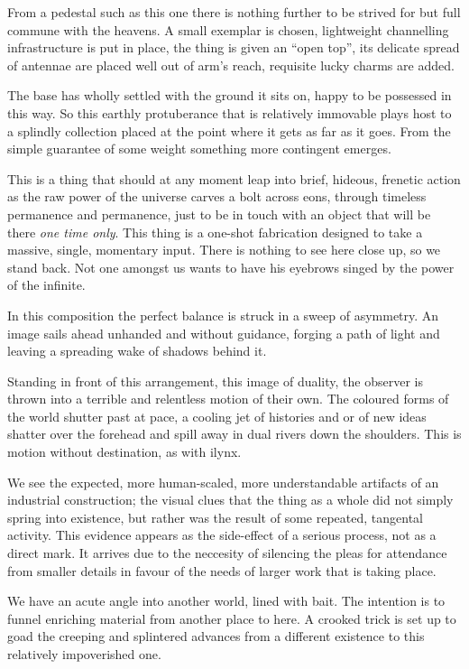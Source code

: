 \documentclass{book}
\begin{document}
From a pedestal such as this one there is nothing further to be strived for but
full commune with the heavens. A small exemplar is chosen, lightweight
channelling infrastructure is put in place, the thing is given an ``open top'',
its delicate spread of antennae are placed well out of arm's reach, requisite
lucky charms are added.

The base has wholly settled with the ground it sits on, happy to be possessed
in this way. So this earthly protuberance that is relatively immovable plays
host to a splindly collection placed at the point where it gets as far as it
goes. From the simple guarantee of some weight something more contingent
emerges.

This is a thing that should at any moment leap into brief, hideous, frenetic
action as the raw power of the universe carves a bolt across eons, through
timeless permanence and permanence, just to be in touch with an object that
will be there \emph{one time only}.  This thing is a one-shot fabrication
designed to take a massive, single, momentary input. There is nothing to see
here close up, so we stand back. Not one amongst us wants to have his eyebrows
singed by the power of the infinite.

In this composition the perfect balance is struck in a sweep of asymmetry. An
image sails ahead unhanded and without guidance, forging a path of light and
leaving a spreading wake of shadows behind it.

Standing in front of this arrangement, this image of duality, the observer is
thrown into a terrible and relentless motion of their own. The coloured forms
of the world shutter past at pace, a cooling jet of histories and or of new
ideas shatter over the forehead and spill away in dual rivers down the
shoulders. This is motion without destination, as with ilynx.

We see the expected, more human-scaled, more understandable artifacts of an
industrial construction; the visual clues that the thing as a whole did not
simply spring into existence, but rather was the result of some repeated,
tangental activity. This evidence appears as the side-effect of a serious
process, not as a direct mark. It arrives due to the neccesity of silencing the
pleas for attendance from smaller details in favour of the needs of larger work
that is taking place.

We have an acute angle into another world, lined with bait. The intention is to
funnel enriching material from another place to here. A crooked trick is set up
to goad the creeping and splintered advances from a different existence to this
relatively impoverished one. 
\end{document}
